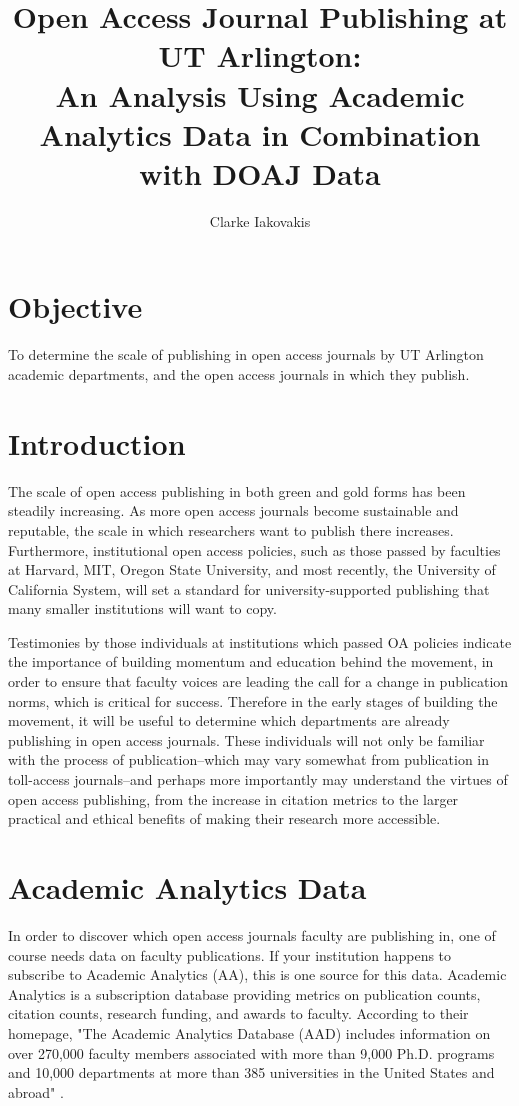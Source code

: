 \documentclass{article}
\begin{document}


\title{\bf Open Access Journal Publishing at UT Arlington: \\ \large An Analysis Using Academic Analytics Data in Combination with DOAJ Data}
\author{Clarke Iakovakis}
\maketitle


\section{Objective}
To determine the scale of publishing in open access journals by UT Arlington academic departments, and the open access journals in which they publish.

\section{Introduction}
The scale of open access publishing in both green and gold forms has been steadily increasing. As more open access journals become sustainable and reputable, the scale in which researchers want to publish there increases. 
Furthermore, institutional open access policies, such as those passed by faculties at Harvard, MIT, Oregon State University, and most recently, the University of California System, will set a standard for university-supported publishing that many smaller institutions will want to copy.

Testimonies by those individuals at institutions which passed OA policies indicate the importance of building momentum and education behind the movement, in order to ensure that faculty voices are leading the call for a change in publication norms, which is critical for success. 
Therefore in the early stages of building the movement, it will be useful to determine which departments are already publishing in open access journals. 
These individuals will not only be familiar with the process of publication--which may vary somewhat from publication in toll-access journals--and perhaps more importantly may understand the virtues of open access publishing, from the increase in citation metrics to the larger practical and ethical benefits of making their research more accessible.


\section{Academic Analytics Data}
In order to discover which open access journals faculty are publishing in, one of course needs data on faculty publications. 
If your institution happens to subscribe to Academic Analytics (AA), this is one source for this data. 
Academic Analytics is a subscription database providing metrics on publication counts, citation counts, research funding, and awards to faculty. 
According to their homepage, "The Academic Analytics Database (AAD) includes information on over 270,000 faculty members associated with more than 9,000 Ph.D. programs and 10,000 departments at more than 385 universities in the United States and abroad" \cite{AcadAn}.
\end{document}
